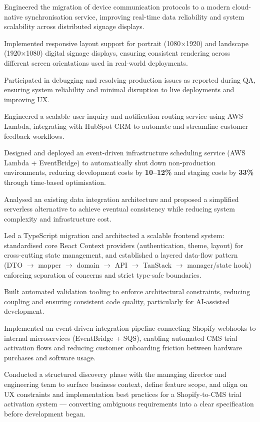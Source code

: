 \documentclass[letterpaper,11pt]{article}
\newcommand{\resumeItem}[1]{
  \item\small #1
}
\begin{document}
                \resumeItem{Engineered the migration of device communication protocols to a modern cloud-native synchronisation service, improving real-time data reliability and system scalability across distributed signage displays.}
                \resumeItem{Implemented responsive layout support for portrait (1080×1920) and landscape (1920×1080) digital signage displays, ensuring consistent rendering across different screen orientations used in real-world deployments.}
                \resumeItem{Participated in debugging and resolving production issues as reported during QA, ensuring system reliability and minimal disruption to live deployments and improving UX.}
                \resumeItem{Engineered a scalable user inquiry and notification routing service using AWS Lambda, integrating with HubSpot CRM to automate and streamline customer feedback workflows.}
                \resumeItem{Designed and deployed an event-driven infrastructure scheduling service (AWS Lambda + EventBridge) to automatically shut down non-production environments, reducing development costs by \textbf{10–12\%} and staging costs by \textbf{33\%} through time-based optimisation.}
                \resumeItem{Analysed an existing data integration architecture and proposed a simplified serverless alternative to achieve eventual consistency while reducing system complexity and infrastructure cost.}
                \resumeItem{Led a TypeScript migration and architected a scalable frontend system: standardised core React Context providers (authentication, theme, layout) for cross-cutting state management, and established a layered data-flow pattern (DTO $\rightarrow$ mapper $\rightarrow$ domain $\rightarrow$ API $\rightarrow$ TanStack $\rightarrow$ manager/state hook) enforcing separation of concerns and strict type-safe boundaries.}
                \resumeItem{Built automated validation tooling to enforce architectural constraints, reducing coupling and ensuring consistent code quality, particularly for AI-assisted development.}
                \resumeItem{Implemented an event-driven integration pipeline connecting Shopify webhooks to internal microservices (EventBridge + SQS), enabling automated CMS trial activation flows and reducing customer onboarding friction between hardware purchases and software usage.}
                \resumeItem{Conducted a structured discovery phase with the managing director and engineering team to surface business context, define feature scope, and align on UX constraints and implementation best practices for a Shopify-to-CMS trial activation system — converting ambiguous requirements into a clear specification before development began.}
\end{document}
